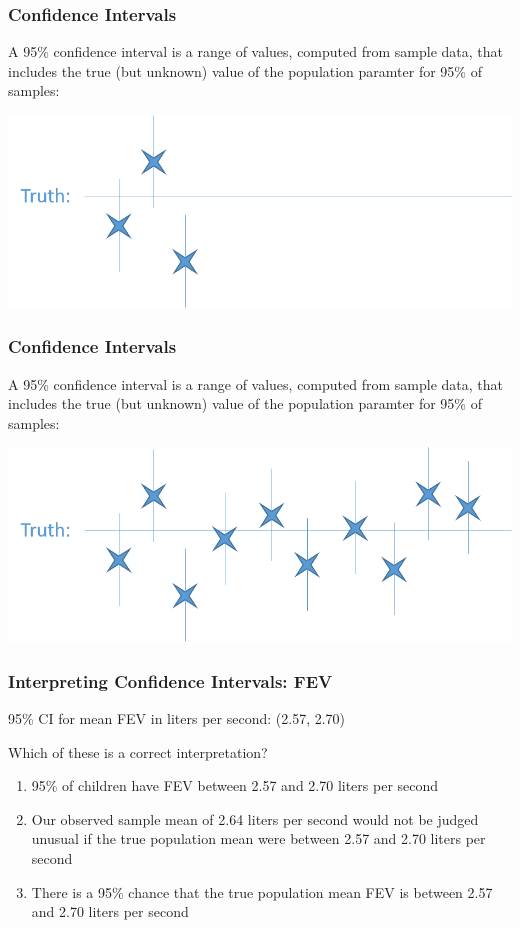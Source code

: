 \documentclass[12pt, 
hyperref={colorlinks=true, linkcolor=blue, urlcolor=cyan}]{beamer}
\begin{document}
\begin{frame}[noframenumbering]
\frametitle{Confidence Intervals}

A 95\% confidence interval is a range of values, computed from sample data, that includes the true (but unknown) value of the population paramter for 95\% of samples:

\includegraphics[width=\textwidth]{./ci_3} 
\end{frame}

\begin{frame}[noframenumbering]
\frametitle{Confidence Intervals}

A 95\% confidence interval is a range of values, computed from sample data, that includes the true (but unknown) value of the population paramter for 95\% of samples:

\includegraphics[width=\textwidth]{./ci_4} %
\end{frame}

\begin{frame}
\frametitle{Interpreting Confidence Intervals: FEV}

95\% CI for mean FEV in liters per second: (2.57, 2.70)

Which of these is a correct interpretation? 
\begin{enumerate}
\item 95\% of children have FEV between 2.57 and 2.70 liters per second
\item Our observed sample mean of 2.64 liters per second would not be judged unusual if the true population mean were between 2.57 and 2.70 liters per second
\item There is a 95\% chance that the true population mean FEV is between 2.57 and 2.70 liters per second
\end{enumerate}

\end{frame}
\end{document}
